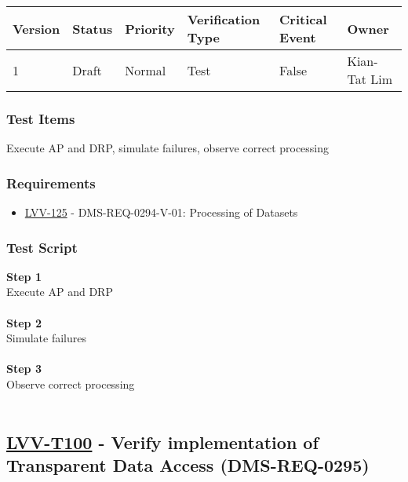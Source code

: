\begin{longtable}[]{@{}llllll@{}}
\toprule
Version & Status & Priority & Verification Type & Critical Event &
Owner\tabularnewline
\midrule
\endhead
1 & Draft & Normal & Test & False & Kian-Tat Lim\tabularnewline
\bottomrule
\end{longtable}

\hypertarget{test-items-75}{%
\subsubsection{Test Items}\label{test-items-75}}

Execute AP and DRP, simulate failures, observe correct processing

\hypertarget{requirements-76}{%
\subsubsection{Requirements}\label{requirements-76}}

\begin{itemize}
\tightlist
\item
  \href{https://jira.lsstcorp.org/browse/LVV-125}{LVV-125} -
  DMS-REQ-0294-V-01: Processing of Datasets
\end{itemize}

\hypertarget{test-script-76}{%
\subsubsection{Test Script}\label{test-script-76}}

\textbf{Step 1}\\
Execute AP and DRP\\
~\\
\textbf{Step 2}\\
\hspace*{0.333em}Simulate failures\\
~\\
\textbf{Step 3}\\
Observe correct processing\\
~\\

\hypertarget{lvv-t100---verify-implementation-of-transparent-data-access-dms-req-0295}{%
\subsection{\texorpdfstring{\href{https://jira.lsstcorp.org/secure/Tests.jspa\#/testCase/LVV-T100}{LVV-T100}
- Verify implementation of Transparent Data Access
(DMS-REQ-0295)}{LVV-T100 - Verify implementation of Transparent Data Access (DMS-REQ-0295)}}\label{lvv-t100---verify-implementation-of-transparent-data-access-dms-req-0295}}

